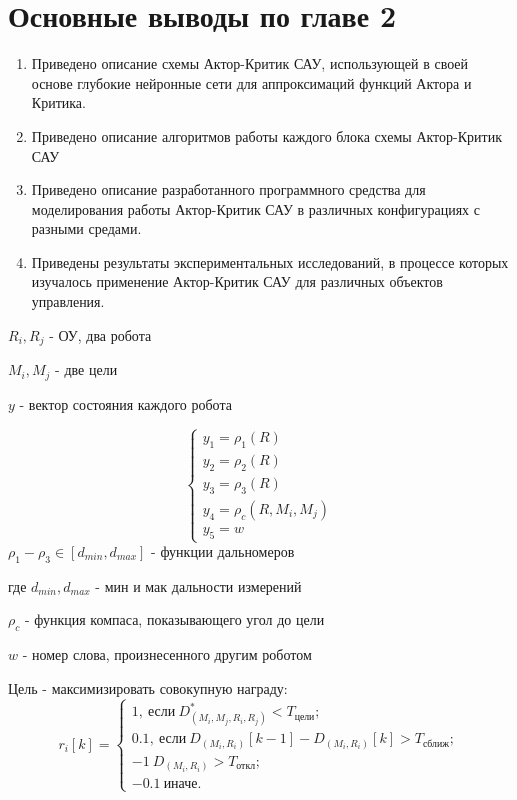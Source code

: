 \section{Основные выводы по главе 2} \label{sect2_4}

\begin{enumerate}
	\item Приведено описание схемы Актор-Критик САУ, использующей в своей основе глубокие нейронные сети для аппроксимаций функций Актора и Критика.
	\item Приведено описание алгоритмов работы каждого блока схемы Актор-Критик САУ
	\item Приведено описание разработанного программного средства для моделирования работы Актор-Критик САУ в различных конфигурациях с разными средами.
	\item Приведены результаты экспериментальных исследований, в процессе которых изучалось применение Актор-Критик САУ для различных объектов управления.
\end{enumerate}




\newpage

$ R_i, R_j $ - ОУ, два робота

$ M_i, M_j $ - две цели

$ y $ - вектор состояния каждого робота

$$
\begin{cases}
y_1 = \rho_1(R) \\
y_2 = \rho_2(R) \\
y_3 = \rho_3(R) \\
y_4 = \rho_c(R, M_i, M_j)\\
y_5 = w
\end{cases}
$$
\newpage
$ \rho_1 - \rho_3 \in [d_{min}, d_{max}] $ - функции дальномеров 

где $ d_{min}, d_{max} $ - мин и мак дальности измерений

$ \rho_c $ - функция компаса, показывающего угол до цели

$ w $ - номер слова, произнесенного другим роботом


Цель - максимизировать совокупную награду:
$$
r_i[k] = \begin{cases}
1, \: \text{если} \: D_{(M_i, M_j, R_i, R_j)}^* < T_{\text{цели}}; \\
0.1, \: \text{если} \: D_{(M_i, R_i)}[k-1] - D_{(M_i, R_i)}[k] > T_{\text{сближ}}; \\
-1 \: D_{(M_i, R_i)} > T_{\text{откл}};\\
-0.1 \: \text{иначе}.
\end{cases}
$$



